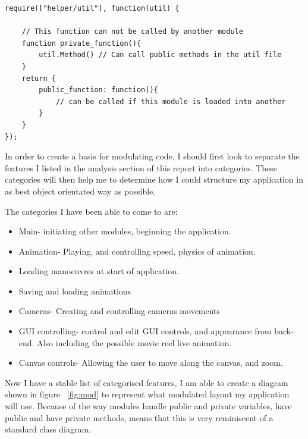 \lstset{language=JavaScript}
\medskip
\begin{lstlisting}[caption=Example showing how RequireJS loads in another module or JavaScript file which in this case is loading up the util JavaScript module and naming it as object 'util' for use in the code]
require(["helper/util"], function(util) { 
	
	// This function can not be called by another module
	function private_function(){
		util.Method() // Can call public methods in the util file
	}
	return {
		public_function: function(){
			// can be called if this module is loaded into another
		}
	}
});
\end{lstlisting}
\label{fig:module}

In order to create a basis for modulating code, I should first look to separate the features I listed in the analysis section of this report into categories. These categories will then help me to determine how I could structure my application in as best object orientated way as possible.

The categories I have been able to come to are:
\begin{itemize}
  \item Main- initiating other modules, beginning the application.
  \item Animation- Playing, and controlling speed, physics of animation.
  \item Loading manoeuvres at start of application.
  \item Saving and loading animations
  \item Cameras- Creating and controlling cameras movements
  \item GUI controlling- control and edit GUI controls, and appearance from back-end. Also including the possible movie reel live animation.
  \item Canvas controls- Allowing the user to move along the canvas, and zoom.
\end{itemize}

Now I have a stable list of categorised features, I am able to create a diagram shown in figure ~\ref{fig:mod} to represent what modulated layout my application will use. Because of the way modules handle public and private variables, have public and have private methods, means that this is very reminiscent of a standard class diagram.

\clearpage

